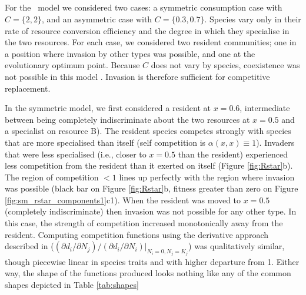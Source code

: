 \documentclass[a4paper,11pt]{article}
\begin{document}
\subsection{\Rstar}



For the \Rstar\ model we considered two cases: a symmetric
consumption case with $C = \{2, 2\}$, and an asymmetric case
with $C = \{0.3, 0.7\}$.  Species vary only in their rate of resource
conversion efficiency and the degree in which they specialise in the
two resources.  For each case, we considered two resident communities;
one in a position where invasion by other types was possible, and one at
the evolutionary optimum point.
%
Because $C$ does not vary by species, coexistence was not possible in
this model \citep{Tilman-1982}. Invasion is therefore sufficient for
competitive replacement.

In the symmetric model, we first considered a resident at $x = 0.6$,
intermediate between being completely indiscriminate about the two resources
at $x = 0.5$ and a specialist on resource B).
The resident species competes strongly with species that are more
specialised than itself (self competition is $\alpha(x, x) \equiv
1$). Invaders that were less specialised (i.e., closer to $x =
0.5$ than the resident) experienced less competition from the resident
than it exerted on itself (Figure \ref{fig:Rstar}b).
%
The region of competition $< 1$ lines up perfectly with the region
where invasion was possible (black bar on Figure \ref{fig:Rstar}b,
fitness greater than zero on Figure
\ref{fig:sm_rstar_components1}c1).
%
When the resident was moved to $x = 0.5$ (completely indiscriminate) then
invasion was not possible for any other type.  In this case, the strength of
competition increased monotonically away from the resident.
%
Computing competition functions using the derivative approach
described in \citet{Abrams-2008}
($(\partial d_i / \partial N_j) / (\partial d_i / \partial N_i) |_{N_i
  = 0, N_j = K_j}$)
was qualitatively similar, though piecewise linear in species traits
and with higher departure from 1.
Either way, the shape of the functions produced looks nothing like any of the
common shapes depicted in Table \ref{tab:shapes}
\end{document}
